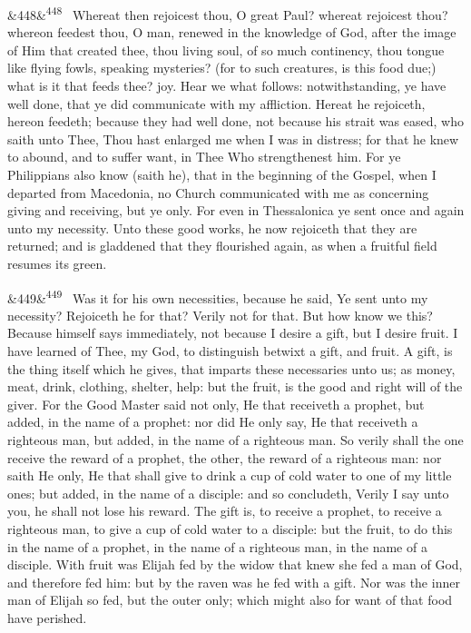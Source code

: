 \documentclass[12pt]{article}
\newcommand{\para}[1][]{\par\noindent\ifx&#1&\else\textsuperscript{\footnotesize #1}~\fi}
\begin{document}
\para[448] Whereat then rejoicest thou, O great Paul? whereat rejoicest thou? whereon feedest thou, O man, renewed in the knowledge of God, after the image of Him that created thee, thou living soul, of so much continency, thou tongue like flying fowls, speaking mysteries? (for to such creatures, is this food due;) what is it that feeds thee? joy. Hear we what follows: notwithstanding, ye have well done, that ye did communicate with my affliction. Hereat he rejoiceth, hereon feedeth; because they had well done, not because his strait was eased, who saith unto Thee, Thou hast enlarged me when I was in distress; for that he knew to abound, and to suffer want, in Thee Who strengthenest him. For ye Philippians also know (saith he), that in the beginning of the Gospel, when I departed from Macedonia, no Church communicated with me as concerning giving and receiving, but ye only. For even in Thessalonica ye sent once and again unto my necessity. Unto these good works, he now rejoiceth that they are returned; and is gladdened that they flourished again, as when a fruitful field resumes its green.

\para[449] Was it for his own necessities, because he said, Ye sent unto my necessity? Rejoiceth he for that? Verily not for that. But how know we this? Because himself says immediately, not because I desire a gift, but I desire fruit. I have learned of Thee, my God, to distinguish betwixt a gift, and fruit. A gift, is the thing itself which he gives, that imparts these necessaries unto us; as money, meat, drink, clothing, shelter, help: but the fruit, is the good and right will of the giver. For the Good Master said not only, He that receiveth a prophet, but added, in the name of a prophet: nor did He only say, He that receiveth a righteous man, but added, in the name of a righteous man. So verily shall the one receive the reward of a prophet, the other, the reward of a righteous man: nor saith He only, He that shall give to drink a cup of cold water to one of my little ones; but added, in the name of a disciple: and so concludeth, Verily I say unto you, he shall not lose his reward. The gift is, to receive a prophet, to receive a righteous man, to give a cup of cold water to a disciple: but the fruit, to do this in the name of a prophet, in the name of a righteous man, in the name of a disciple. With fruit was Elijah fed by the widow that knew she fed a man of God, and therefore fed him: but by the raven was he fed with a gift. Nor was the inner man of Elijah so fed, but the outer only; which might also for want of that food have perished.
\end{document}
